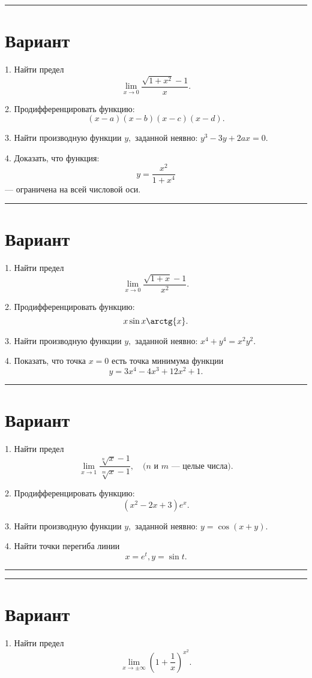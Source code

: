 \documentclass[a4paper,10pt]{article}
\newcommand{\exercize}[1]{\textbf{#1.}}
\newcommand{\HRule}{\rule{\linewidth}{0.1mm}}
\begin{document}
\HRule
\section{Вариант}
1. Найти предел
\[ \lim_{x \rightarrow 0}{\frac{\sqrt{1 + x^2} - 1}{x}}. \]

2. Продифференцировать функцию:
\[ (x - a)(x - b)(x - c)(x - d). \]

3. Найти производную функции $y,$ заданной неявно: $ y^3 - 3y + 2 a x = 0. $

4. Доказать, что функция: 
\[ y = \frac{x^2}{1 + x^4} \]
--- ограничена на всей числовой оси.

\HRule

\section{Вариант}
1. Найти предел
\[ \lim_{x \rightarrow 0}{\frac{\sqrt{1 + x} - 1}{x^2}}. \]

2. Продифференцировать функцию: 
\[ x \sin{x} \arctg{x}. \]

3. Найти производную функции $y,$ заданной неявно: $ x^4 + y^4 = x^2 y^2. $

4. Показать, что точка $x = 0$ есть точка минимума функции
\[ y = 3 x^4 - 4 x^3 + 12 x^2 + 1. \]

\HRule


\section{Вариант} 
1. Найти предел
\[ \lim_{x \rightarrow 1}{\frac{\sqrt[n]{x} - 1}{\sqrt[m]{x} - 1}}, \quad \textrm{($n$ и $m$ --- целые числа).} \]

2. Продифференцировать функцию:
\[ (x^2 - 2x + 3) e^x. \]

3. Найти производную функции $y,$ заданной неявно: $ y = \cos{(x + y)}. $

4. Найти точки перегиба линии
\[ x = e^t, y = \sin{t}. \]

\HRule
\newpage
\HRule

\section{Вариант} 

1. Найти предел
\[ \lim_{x \rightarrow \pm \infty}{\left(1 + \frac{1}{x}\right)^{x^2}}. \]
\end{document}
